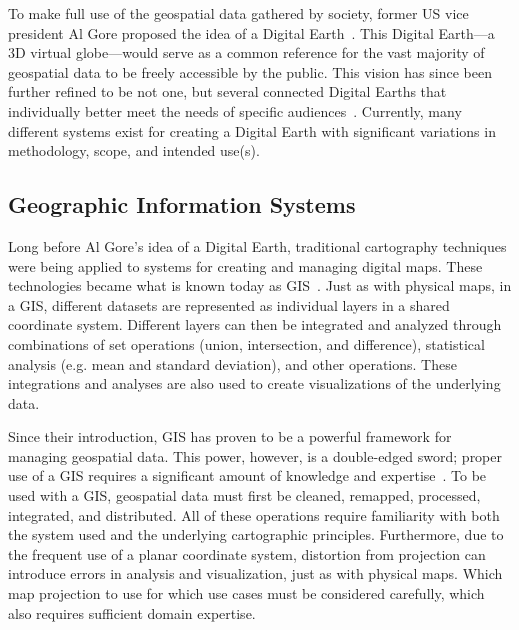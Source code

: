 To make full use of the geospatial data gathered by society, former US vice president Al Gore proposed the idea of a Digital Earth~\cite{gore1998}.
This Digital Earth---a 3D virtual globe---would serve as a common reference for the vast majority of geospatial data to be freely accessible by the public.
This vision has since been further refined to be not one, but several connected Digital Earths that individually better meet the needs of specific audiences~\cite{goodchild2012next}.
Currently, many different systems exist for creating a Digital Earth with significant variations in methodology, scope, and intended use(s).


\subsection{Geographic Information Systems} \label{chap:2:GIS}
Long before Al Gore's idea of a Digital Earth, traditional cartography techniques were being applied to systems for creating and managing digital maps.
These technologies became what is known today as GIS~\cite{foresman1998history}.
Just as with physical maps, in a GIS, different datasets are represented as individual layers in a shared coordinate system.
Different layers can then be integrated and analyzed through combinations of set operations (union, intersection, and difference), statistical analysis (e.g. mean and standard deviation), and other operations.
These integrations and analyses are also used to create visualizations of the underlying data.


Since their introduction, GIS has proven to be a powerful framework for managing geospatial data.
This power, however, is a double-edged sword; proper use of a GIS requires a significant amount of knowledge and expertise~\cite{antenucci1991geographic}.
To be used with a GIS, geospatial data must first be cleaned, remapped, processed, integrated, and distributed.
All of these operations require familiarity with both the system used and the underlying cartographic principles.
Furthermore, due to the frequent use of a planar coordinate system, distortion from projection can introduce errors in analysis and visualization, just as with physical maps.
Which map projection to use for which use cases must be considered carefully, which also requires sufficient domain expertise.


